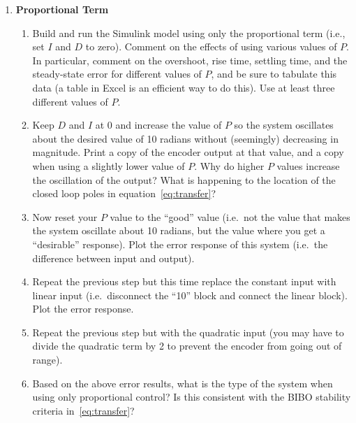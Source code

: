 \begin{enumerate}
    \item \textbf{Proportional Term}\label{step:3} \begin{enumerate}
              \item Build and run the \textsf{Simulink} model using only the
                    proportional term (i.e., set \(I\) and
                    \(D\) to zero). Comment on the effects of using various values of \(P\).
                    In particular, comment on the overshoot, rise time, settling time, and the
                    steady-state error for different values of \(P\), and be sure to tabulate this data (a table in Excel is an efficient way to do this). Use at least three different values of \(P\).

              \item Keep \(D\) and \(I\) at 0 and increase the value of \(P\) so the
                    system oscillates about the desired value of 10 radians without (seemingly)
                    decreasing in magnitude. Print a copy of the encoder output at that value, and a copy when using a slightly lower value of \(P\). Why do higher \(P\) values increase the oscillation of the output? What is
                    happening to the location of the closed loop poles in equation~\eqref{eq:transfer}?

              \item Now reset your \(P\) value to the ``good'' value (i.e.\ not the value that makes
                    the system oscillate about 10 radians, but the value where you get a ``desirable'' response). Plot the error response of this system (i.e.\ the difference between input and output).
              \item Repeat the previous step but this time replace the constant input with linear input (i.e.\ disconnect the ``10'' block and connect the linear block). Plot the error response.
              \item Repeat the previous step but with the quadratic input (you may have to divide the quadratic term by 2 to prevent the encoder from going out of range).
              \item Based on the above error results, what is the type of the system when using only proportional control? Is this consistent with the BIBO stability criteria in~\eqref{eq:transfer}?
          \end{enumerate}


\end{enumerate}
